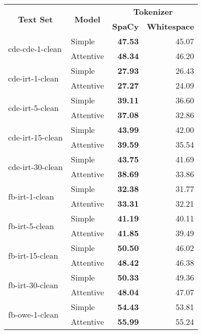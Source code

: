 \begin{tabular}{| l | l | r | r |}
    \hline

    \multicolumn{1}{|c|}{\multirow{2}{*}{\textbf{Text Set}}} &
    \multicolumn{1}{|c|}{\multirow{2}{*}{\textbf{Model}}} &
    \multicolumn{2}{|c|}{\textbf{Tokenizer}} \\

    &
    &
    \multicolumn{1}{|c|}{\textbf{SpaCy}} &
    \multicolumn{1}{|c|}{\textbf{Whitespace}} \\

    \hline \hline

    \multirow{2}{*}{cde-cde-1-clean}
    & Simple    & \textbf{47.53} & 45.07 \\
    & Attentive & \textbf{48.34} & 46.20 \\ \hline

    \multirow{2}{*}{cde-irt-1-clean}
    & Simple    & \textbf{27.93} & 26.43 \\
    & Attentive & \textbf{27.27} & 24.09 \\ \hline

    \multirow{2}{*}{cde-irt-5-clean}
    & Simple    & \textbf{39.11} & 36.60 \\
    & Attentive & \textbf{37.08} & 32.86 \\ \hline

    \multirow{2}{*}{cde-irt-15-clean}
    & Simple    & \textbf{43.99} & 42.00 \\
    & Attentive & \textbf{39.59} & 35.54 \\ \hline

    \multirow{2}{*}{cde-irt-30-clean}
    & Simple    & \textbf{43.75} & 41.69 \\
    & Attentive & \textbf{38.69} & 33.86 \\ \hline \hline

    \multirow{2}{*}{fb-irt-1-clean}
    & Simple    & \textbf{32.38} & 31.77 \\
    & Attentive & \textbf{33.31} & 32.21 \\ \hline

    \multirow{2}{*}{fb-irt-5-clean}
    & Simple    & \textbf{41.19} & 40.11 \\
    & Attentive & \textbf{41.85} & 39.49 \\ \hline

    \multirow{2}{*}{fb-irt-15-clean}
    & Simple    & \textbf{50.50} & 46.02 \\
    & Attentive & \textbf{48.42} & 46.38 \\ \hline

    \multirow{2}{*}{fb-irt-30-clean}
    & Simple    & \textbf{50.33} & 49.36 \\
    & Attentive & \textbf{48.04} & 47.07 \\ \hline

    \multirow{2}{*}{fb-owe-1-clean}
    & Simple    & \textbf{54.43} & 53.81 \\
    & Attentive & \textbf{55.99} & 55.24 \\ \hline

\end{tabular}
